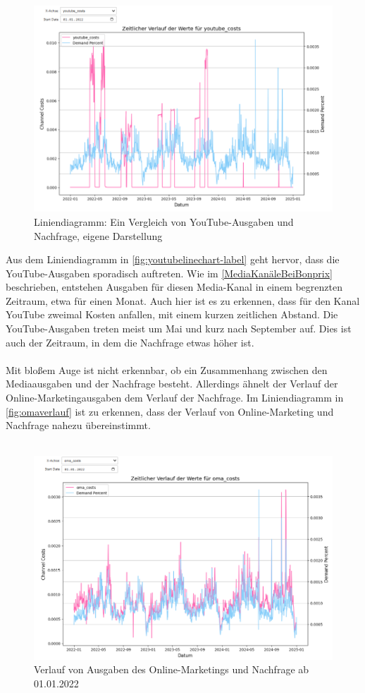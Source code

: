 \begin{figure}[ht]
    \centering
    \includegraphics[width=0.98\linewidth]{images/youtubeLineChart.png}
    \caption{Liniendiagramm: Ein Vergleich von YouTube-Ausgaben und Nachfrage, eigene Darstellung}
    \label{fig:youtubelinechart-label}
\end{figure}
Aus dem Liniendiagramm in \autoref{fig:youtubelinechart-label} geht hervor, dass die YouTube-Ausgaben sporadisch auftreten. Wie im \autoref{MediaKanäleBeiBonprix} beschrieben, entstehen Ausgaben für diesen Media-Kanal in einem begrenzten Zeitraum, etwa für einen Monat. Auch hier ist es zu erkennen, dass für den Kanal YouTube zweimal Kosten anfallen, mit einem kurzen zeitlichen Abstand. Die YouTube-Ausgaben treten meist um Mai und kurz nach September auf. Dies ist auch der Zeitraum, in dem die Nachfrage etwas höher ist. \\\\
Mit bloßem Auge ist nicht erkennbar, ob ein Zusammenhang zwischen den Mediaausgaben und der Nachfrage besteht. Allerdings ähnelt der Verlauf der Online-Marketingausgaben dem Verlauf der Nachfrage. Im Liniendiagramm in \autoref{fig:omaverlauf} ist zu erkennen, dass der Verlauf von Online-Marketing und Nachfrage nahezu übereinstimmt. \\\\
\begin{figure}
    \centering
    \includegraphics[width=0.75\linewidth]{images/omacosts.png}
    \caption{Verlauf von Ausgaben des Online-Marketings und Nachfrage ab 01.01.2022}
    \label{fig:omaverlauf}
\end{figure}
